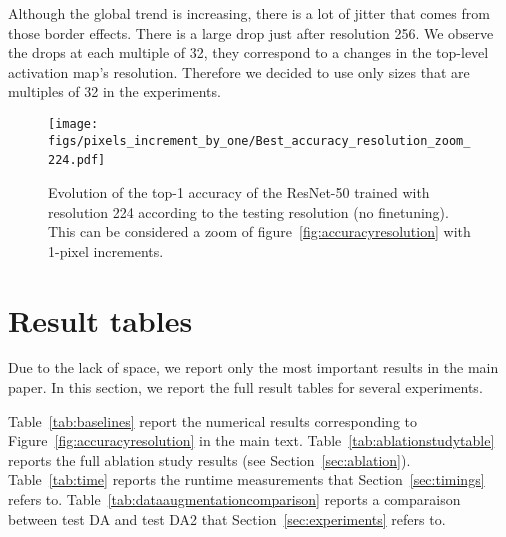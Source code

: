 \documentclass{article}
\begin{document}
Although the global trend is increasing, there is a lot of jitter that comes from those border effects. 
There is a large drop just after resolution 256.
We observe the drops at each multiple of 32, they correspond to a changes in the top-level activation map's resolution.
Therefore we decided to use only sizes that are multiples of 32 in the experiments. 

\begin{figure}[t]
\begin{center}
\texttt{[image: figs/pixels\_increment\_by\_one/Best\_accuracy\_resolution\_zoom\_224.pdf]}~\end{center}
\caption{\label{fig:onepixels}
    Evolution of the top-1 accuracy of the ResNet-50 trained with resolution 224 according to the testing resolution (no finetuning).
    This can be considered a zoom of figure~\ref{fig:accuracyresolution} with 1-pixel increments.
}
\end{figure}





\section{Result tables}
\label{sec:resulttables}

Due to the lack of space, we report only the most important results in the main paper. 
In this section, we report the full result tables for several experiments.

Table~\ref{tab:baselines} report the numerical results corresponding to Figure~\ref{fig:accuracyresolution} in the main text.
Table~\ref{tab:ablationstudytable} reports the full ablation study results (see Section~\ref{sec:ablation}). 
\label{sec:supptimings}
Table~\ref{tab:time} reports the runtime measurements that Section~\ref{sec:timings} refers to.
Table~\ref{tab:dataaugmentationcomparison} reports a comparaison between test DA and test DA2 that Section~\ref{sec:experiments} refers to. 
 
\end{document}

